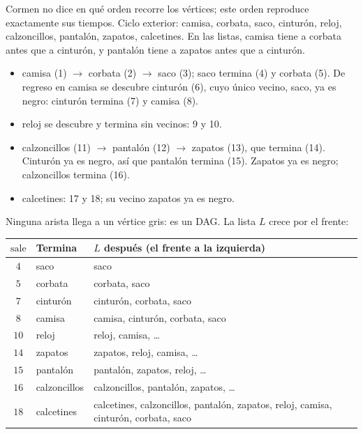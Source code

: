 \documentclass[11pt,letterpaper]{article}
\begin{document}
\begin{ejemplo}
  Cormen no dice en qué orden recorre los vértices; este orden
  reproduce exactamente sus tiempos. Ciclo exterior: camisa, corbata,
  saco, cinturón, reloj, calzoncillos, pantalón, zapatos, calcetines.
  En las listas, camisa tiene a corbata antes que a cinturón, y
  pantalón tiene a zapatos antes que a cinturón.
  \begin{itemize}[itemsep=0.1em]
    \item camisa (1) $\to$ corbata (2) $\to$ saco (3); saco termina (4)
          y corbata (5). De regreso en camisa se descubre cinturón (6),
          cuyo único vecino, saco, ya es negro: cinturón termina (7) y
          camisa (8).
    \item reloj se descubre y termina sin vecinos: 9 y 10.
    \item calzoncillos (11) $\to$ pantalón (12) $\to$ zapatos (13), que
          termina (14). Cinturón ya es negro, así que pantalón termina
          (15). Zapatos ya es negro; calzoncillos termina (16).
    \item calcetines: 17 y 18; su vecino zapatos ya es negro.
  \end{itemize}
  Ninguna arista llega a un vértice gris: es un DAG. La lista $L$
  crece por el frente:
  \begin{center}
  \small
  \begin{tabular}{cll}
    \toprule
    $\text{sale}$ & \textbf{Termina} & \textbf{$L$ después (el frente
      a la izquierda)} \\
    \midrule
    $4$ & saco & saco \\
    $5$ & corbata & corbata, saco \\
    $7$ & cinturón & cinturón, corbata, saco \\
    $8$ & camisa & camisa, cinturón, corbata, saco \\
    $10$ & reloj & reloj, camisa, \ldots \\
    $14$ & zapatos & zapatos, reloj, camisa, \ldots \\
    $15$ & pantalón & pantalón, zapatos, reloj, \ldots \\
    $16$ & calzoncillos & calzoncillos, pantalón, zapatos, \ldots \\
    $18$ & calcetines & calcetines, calzoncillos, pantalón, zapatos,
      reloj, camisa, cinturón, corbata, saco \\
    \bottomrule
  \end{tabular}
  \end{center}

\end{ejemplo}
\end{document}
